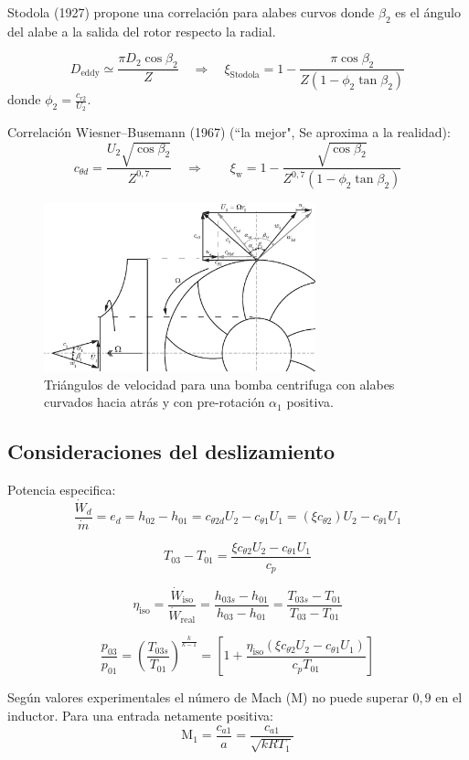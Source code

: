 \documentclass{article}
\newcommand{\cp}{c_p}
\newcommand{\gasconst}{k}
\newcommand{\ctegas}{\gasconst}
\newcommand{\speedsound}{a}
\newcommand{\ctan}[1]{\ensuremath{c_{\theta #1}}}
\newcommand{\crad}[1]{\ensuremath{c_{r #1}}}
\newcommand{\cax}[1]{\ensuremath{c_{a #1}}}
\newcommand{\Mach}{\textrm{M}}
\newcommand{\etaiso}{\eta_{\mathrm{iso}}}
\newcommand{\dW}{\dot{W}}
\newcommand{\dm}{\dot{m}}
\newcommand{\slip}{\xi}
\begin{document}
Stodola (1927) propone una correlación para alabes curvos donde $\beta_2$ es el ángulo del alabe a la salida del rotor respecto la radial.

\[
D_{\mathrm{eddy}}\simeq \frac{\pi D_2\cos \beta_2}{Z} \quad\Rightarrow \quad \slip_{\mathrm{Stodola}} = 1-\frac{\pi \cos \beta_2}{Z(1-\phi_2 \tan \beta_2)}
\]
donde $\phi_2 =\frac{\crad{2}}{U_2}$.

Correlación Wiesner--Busemann (1967) (``la mejor", Se aproxima a la realidad):
\[
\ctan{d} =\frac{U_2\sqrt{\cos \beta_2}}{Z^{0,7}}
\quad\Rightarrow\qquad
\slip_{\mathrm{w}} = 1 - \frac{\sqrt{\cos \beta_2}}{Z^{0,7}(1-\phi_2\tan \beta_2)}
\]

\begin{figure}[htb!]
    \centering
    \includegraphics[width=0.7\textwidth]{fig/centrifugoVelocityTriangle.eps}
    \caption{Triángulos de velocidad para una bomba centrifuga con alabes curvados hacia atrás y con pre-rotación $\alpha_1$ positiva. }
    \label{fig:my_label}
\end{figure}
\subsection{Consideraciones del deslizamiento}
Potencia especifica:
\[
\frac{\dW_d}{\dm}=e_d = h_{02}-h_{01}=\ctan{2d} U_2 - \ctan{1} U_1 = (\slip \ctan{2})U_2 - \ctan{1} U_1
\]

\[
T_{03}-T_{01} = \frac{\slip \ctan{2}U_2-\ctan{1}U_1}{\cp}
\]

\[
\etaiso = \frac{\dW_{\mathrm{iso}}}{\dW_{\mathrm{real}}} = \frac{h_{03s}-h_{01}}{h_{03}-h_{01}}= \frac{T_{03s}-T_{01}}{T_{03}-T_{01}}
\]

\[
\frac{p_{03}}{p_{01}}= \left( \frac{T_{03s}}{T_{01}}\right)^{\frac{\ctegas}{\ctegas-1}} =\left[ 1+ \frac{\etaiso (\slip \ctan{2}U_2 - \ctan{1}U_1)}{\cp T_{01}} \right]
\]

Según valores experimentales el número de Mach ($\Mach$) no puede superar $0,9$ en el inductor. Para una entrada netamente positiva:
\[
\Mach_1 = \frac{\cax{1}}{\speedsound} = \frac{\cax{1}}{\sqrt{\ctegas R T_1}}
\]
\end{document}

